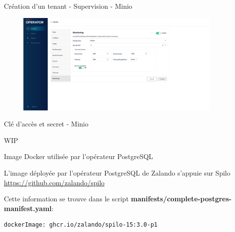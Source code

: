 \begin{frame}[fragile]{Création d'un tenant - Supervision - Minio}

\begin{figure}
\begin{center}
\includegraphics[angle=0, width=0.9\textwidth, height=0.9\textheight]{images/monitoring_minio.eps}
\end{center}
\end{figure}

\end{frame}


\begin{frame}[fragile]{Clé d'accès et secret - Minio}

   WIP

\end{frame}


\begin{frame}[fragile]{Image Docker utilisée par l'opérateur PostgreSQL}

   L'image déployée par l'opérateur PostgreSQL de Zalando s'appuie sur Spilo 
\url{https://github.com/zalando/spilo}

   Cette information se trouve dans le script \textbf{manifests/complete-postgres-manifest.yaml}:
\begin{Verbatim}[commandchars=\&\#\#]
  dockerImage: ghcr.io/zalando/spilo-15:3.0-p1
\end{Verbatim}

\end{frame}


